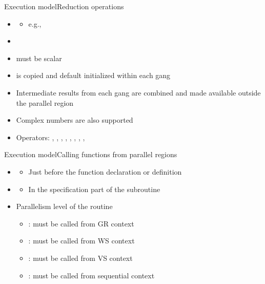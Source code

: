 \documentclass[12pt,aspectratio=169]{beamer}
\begin{document}
\begin{frame}[fragile]{Execution model}{Reduction operations}
  \begin{itemize}
  \item {}
    \begin{itemize}
    \item e.g., 
    \end{itemize}
  \item {}
  \item {} must be scalar
  \item {} is copied and default initialized within each gang
  \item Intermediate results from each gang are combined and made available outside the parallel region
  \item Complex numbers are also supported
  \item Operators: \lstinlineCpp{+}, \lstinlineCpp{*}, , , \lstinlineCpp{&}, \lstinlineCpp{|}, \lstinlineCpp{\%}, \lstinlineCpp{&&}, \lstinlineCpp{||}
  \end{itemize}
\end{frame}

\begin{frame}[fragile]{Execution model}{Calling functions from parallel regions}
  \begin{itemize}
  \item {}
    \begin{itemize}
    \item Just before the function declaration or definition
    \end{itemize}
  \item {}
    \begin{itemize}
    \item In the specification part of the subroutine
    \end{itemize}
  \item Parallelism level of the routine
    \begin{itemize}
    \item {}: must be called from GR context
    \item {}: must be called from WS context
    \item {}: must be called from VS context
    \item {}: must be called from sequential context
    \end{itemize}
  \end{itemize}
\end{frame}
\end{document}
